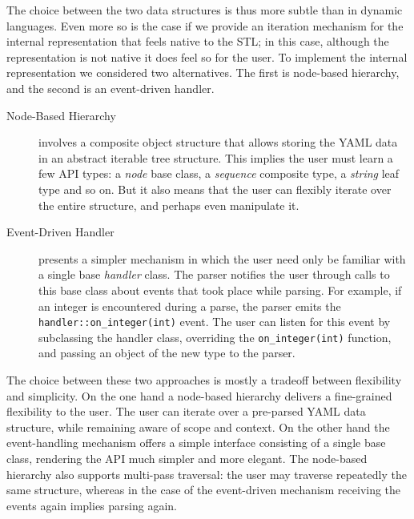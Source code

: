 \documentclass{article}
\begin{document}
The choice between the two data structures is thus more subtle than in dynamic 
languages.  Even more so is the case if we provide an iteration mechanism for 
the internal representation that feels native to the STL;  in this case, 
although the representation is not native it does feel so for the user.  To 
implement the internal representation we considered two alternatives.  The 
first is node-based hierarchy, and the second is an event-driven handler.

\begin{description}
  \item[Node-Based Hierarchy] involves a composite object structure that allows 
    storing the YAML data in an abstract iterable tree structure.  This implies 
    the user must learn a few API types:  a \emph{node} base class, a 
    \emph{sequence} composite type, a \emph{string} leaf type and so on.  But 
    it also means that the user can flexibly iterate over the entire structure, 
    and perhaps even manipulate it.
  \item[Event-Driven Handler] presents a simpler mechanism in which the user 
    need only be familiar with a single base \emph{handler} class.  The parser 
    notifies the user through calls to this base class about events that took 
    place while parsing.  For example, if an integer is encountered during a 
    parse, the parser emits the \texttt{handler::on\_integer(int)} event.  The 
    user can listen for this event by subclassing the handler class, overriding 
    the \texttt{on\_integer(int)} function, and passing an object of the new 
    type to the parser.
\end{description}

The choice between these two approaches is mostly a tradeoff between 
flexibility and simplicity.  On the one hand a node-based hierarchy delivers a 
fine-grained flexibility to the user.  The user can iterate over a pre-parsed 
YAML data structure, while remaining aware of scope and context.  On the other 
hand the event-handling mechanism offers a simple interface consisting of a 
single base class, rendering the API much simpler and more elegant.  The 
node-based hierarchy also supports multi-pass traversal:  the user may traverse 
repeatedly the same structure, whereas in the case of the event-driven 
mechanism receiving the events again implies parsing again.
\end{document}
